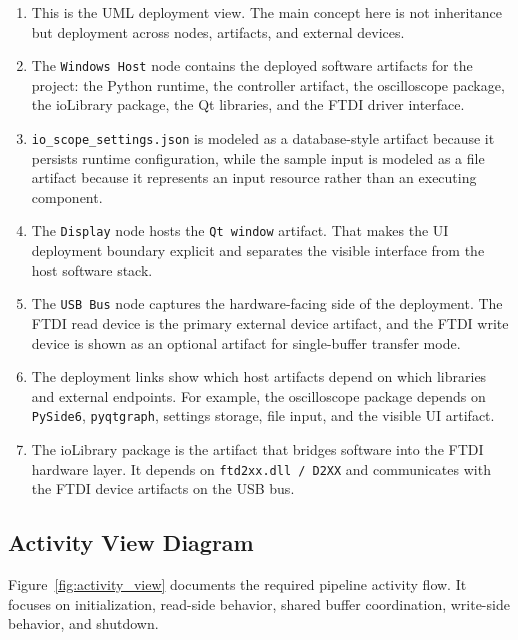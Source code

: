 \begin{enumerate}
    \item This is the UML deployment view. The main concept here is not inheritance but deployment across nodes, artifacts, and external devices.
    \item The \texttt{Windows Host} node contains the deployed software artifacts for the project: the Python runtime, the controller artifact, the oscilloscope package, the ioLibrary package, the Qt libraries, and the FTDI driver interface.
    \item \texttt{io\_scope\_settings.json} is modeled as a database-style artifact because it persists runtime configuration, while the sample input is modeled as a file artifact because it represents an input resource rather than an executing component.
    \item The \texttt{Display} node hosts the \texttt{Qt window} artifact. That makes the UI deployment boundary explicit and separates the visible interface from the host software stack.
    \item The \texttt{USB Bus} node captures the hardware-facing side of the deployment. The FTDI read device is the primary external device artifact, and the FTDI write device is shown as an optional artifact for single-buffer transfer mode.
    \item The deployment links show which host artifacts depend on which libraries and external endpoints. For example, the oscilloscope package depends on \texttt{PySide6}, \texttt{pyqtgraph}, settings storage, file input, and the visible UI artifact.
    \item The ioLibrary package is the artifact that bridges software into the FTDI hardware layer. It depends on \texttt{ftd2xx.dll / D2XX} and communicates with the FTDI device artifacts on the USB bus.
\end{enumerate}

\subsection{Activity View Diagram}
\label{Section::Activity View Diagram}


Figure~\ref{fig:activity_view} documents the required pipeline activity flow. It focuses on initialization, read-side behavior, shared buffer coordination, write-side behavior, and shutdown.

